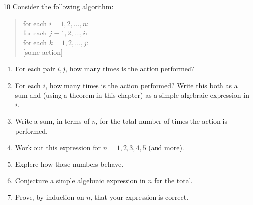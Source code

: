 \begin{exercise}{10}
    Consider the following algorithm:
    \begin{quote}
        for each $i=1,2,\dots,n$:\\
        \hspace*{1em} for each $j=1,2,\dots,i$:\\
        \hspace*{2em} for each $k=1,2,\dots,j$:\\
        \hspace*{3em} [some action]
    \end{quote}
    \begin{enumerate}[label=(\alph*)]
        \item For each pair $i,j$, how many times is the action performed?
        \item For each $i$, how many times is the action performed? Write this
              both as a sum and (using a theorem in this chapter) as a simple
              algebraic expression in $i$.
        \item Write a sum, in terms of $n$, for the total number of times the
              action is performed.
        \item Work out this expression for $n=1,2,3,4,5$ (and more).
        \item Explore how these numbers behave.
        \item Conjecture a simple algebraic expression in $n$ for the total.
        \item Prove, by induction on $n$, that your expression is correct.
    \end{enumerate}
\end{exercise}
